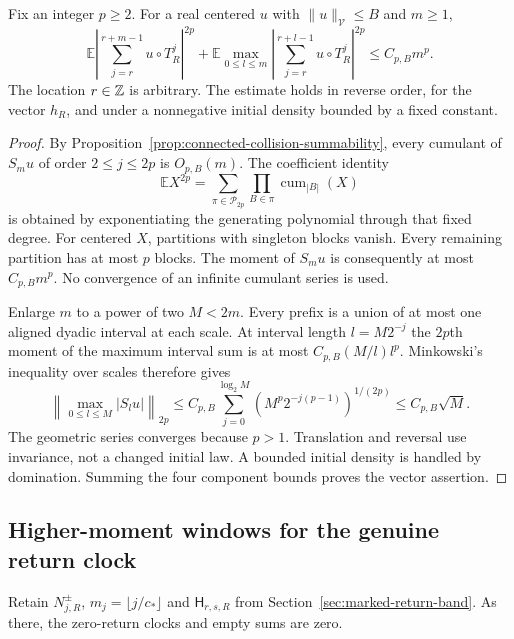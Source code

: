\begin{lemma}
\label{lem:fixed-even-maximal}
Fix an integer $p\ge2$. For a real centered $u$ with
$\|u\|_{\mathcal V}\le B$ and $m\ge1$,
\begin{equation}\label{eq:fixed-even-maximal}
 \mathbb E\left|\sum_{j=r}^{r+m-1}u\circ T_R^j\right|^{2p}
 +\mathbb E\max_{0\le l\le m}
       \left|\sum_{j=r}^{r+l-1}u\circ T_R^j\right|^{2p}
       \le C_{p,B}m^p.
\end{equation}
The location $r\in\mathbb Z$ is arbitrary. The estimate holds in reverse
order, for the vector $h_R$, and under a nonnegative initial density
bounded by a fixed constant.
\end{lemma}
\begin{proof}
By Proposition~\ref{prop:connected-collision-summability}, every
cumulant of $S_m u$ of order $2\le j\le2p$ is $O_{p,B}(m)$.
The coefficient identity
\[
 \mathbb E X^{2p}=\sum_{\pi\in\mathcal P_{2p}}
                         \prod_{B\in\pi}\operatorname{cum}_{|B|}(X)
\]
is obtained by exponentiating the generating polynomial through that
fixed degree. For centered $X$, partitions with singleton blocks
vanish. Every remaining partition has at most $p$ blocks. The
moment of $S_m u$ is consequently at most $C_{p,B}m^p$.
No convergence of an infinite cumulant series is used.

Enlarge $m$ to a power of two $M<2m$. Every prefix is a union of at
most one aligned dyadic interval at each scale. At interval length
$l=M2^{-j}$ the $2p$th moment of the maximum interval sum is at most
$C_{p,B}(M/l)l^p$. Minkowski's inequality over scales therefore gives
\[
 \left\|\max_{0\le l\le M}|S_lu|\right\|_{2p}
 \le C_{p,B}\sum_{j=0}^{\log_2 M}
                 (M^p2^{-j(p-1)})^{1/(2p)}
 \le C_{p,B}\sqrt M.
\]
The geometric series converges because $p>1$. Translation and
reversal use invariance, not a changed initial law. A bounded initial
density is handled by domination. Summing the four component bounds
proves the vector assertion.
\end{proof}

\subsection{Higher-moment windows for the genuine return clock}
Retain $N^\pm_{j,R}$, $m_j=\lfloor j/c_*\rfloor$ and
$\mathsf H_{r,s,R}$ from Section~\ref{sec:marked-return-band}.
As there, the zero-return clocks and empty sums are zero.


